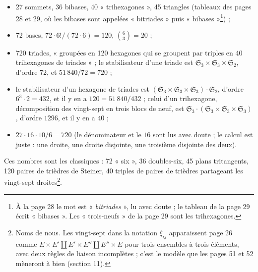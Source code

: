 \documentclass[11pt,a4paper]{article}
\begin{document}
\begin{itemize}
\item 27 sommets, 36 bibases, 40 « trihexagones », 45 triangles (tableaux des
  pages 28 et 29, où les bibases sont appelées « bitriades » puis
  « bibases »\footnote{À la page 28 le mot est « \emph{bitriades} », lu avec
  doute ; le tableau de la page 29 écrit « bibases ». Les « trois-neufs » de la
  page 29 sont les trihexagones.}) ;
\item 72 bases, $72 \cdot 6! / (72 \cdot 6) = 120$, $\binom{6}{3} = 20$ ;
\item 720 triades, « groupées en 120 hexagones qui se groupent par triples en
  40 trihexagones de triades » ; le stabilisateur d'une triade est
  $\mathfrak{S}_3 \times \mathfrak{S}_3 \times \mathfrak{S}_2$, d'ordre 72, et
  $51\,840/72 = 720$ ;
\item le stabilisateur d'un hexagone de triades est $(\mathfrak{S}_3 \times
  \mathfrak{S}_3 \times \mathfrak{S}_3) \cdot \mathfrak{S}_2$, d'ordre $6^3
  \cdot 2 = 432$, et il y en a $120 = 51\,840/432$ ; celui d'un trihexagone,
  décomposition des vingt-sept en trois blocs de neuf, est $\mathfrak{S}_3
  \cdot (\mathfrak{S}_3 \times \mathfrak{S}_3 \times \mathfrak{S}_3)$, d'ordre
  $1296$, et il y en a $40$ ;
\item $27 \cdot 16 \cdot 10 / 6 = 720$ (le dénominateur et le $16$ sont lus
  avec doute ; le calcul est juste : une droite, une droite disjointe, une
  troisième disjointe des deux).
\end{itemize}

Ces nombres sont les classiques : 72 « six », 36 doubles-six, 45 plans
tritangents, 120 paires de trièdres de Steiner, 40 triples de paires de
trièdres partageant les vingt-sept droites\footnote{Noms de nous. Les
vingt-sept dans la notation $\xi_{ij}$ apparaissent page 26 comme $E \times E'
\amalg E' \times E'' \amalg E'' \times E$ pour trois ensembles à trois éléments,
avec deux règles de liaison incomplètes ; c'est le modèle que les pages 51 et
52 mèneront à bien (section 11).}.
\end{document}
